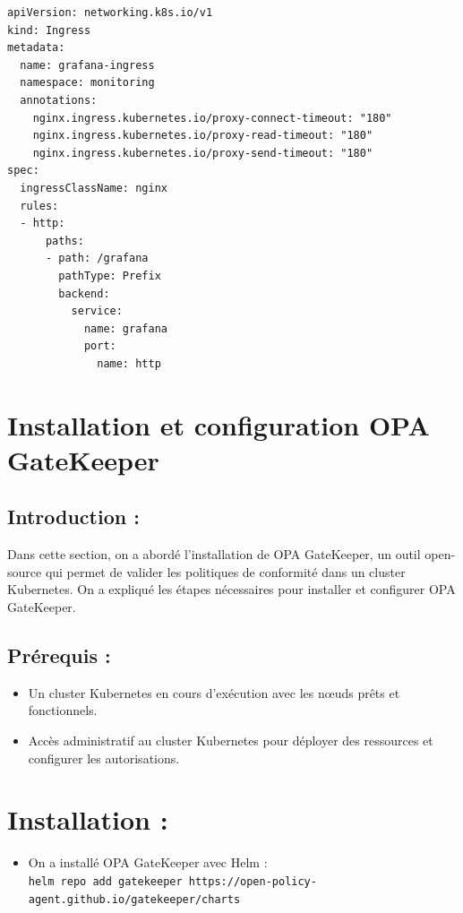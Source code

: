 \begin{verbatim}
apiVersion: networking.k8s.io/v1
kind: Ingress
metadata:
  name: grafana-ingress
  namespace: monitoring
  annotations:
    nginx.ingress.kubernetes.io/proxy-connect-timeout: "180"
    nginx.ingress.kubernetes.io/proxy-read-timeout: "180"
    nginx.ingress.kubernetes.io/proxy-send-timeout: "180"
spec:
  ingressClassName: nginx
  rules:
  - http:
      paths:
      - path: /grafana
        pathType: Prefix
        backend:
          service:
            name: grafana
            port:
              name: http
\end{verbatim}
\section*{Installation et configuration OPA GateKeeper}

\subsection*{Introduction :}

Dans cette section, on a abordé l’installation de OPA GateKeeper, un outil open-source qui permet de valider les politiques de conformité dans un cluster Kubernetes. On a expliqué les étapes nécessaires pour installer et configurer OPA GateKeeper.

\subsection*{Prérequis :}

\begin{itemize}
\item Un cluster Kubernetes en cours d’exécution avec les nœuds prêts et fonctionnels.
\item Accès administratif au cluster Kubernetes pour déployer des ressources et configurer les autorisations.
\end{itemize}

\section*{Installation :}

\begin{itemize}

\item On a installé OPA GateKeeper avec Helm : \\
\texttt{helm repo add gatekeeper https://open-policy-agent.github.io/gatekeeper/charts}

\end{itemize}

